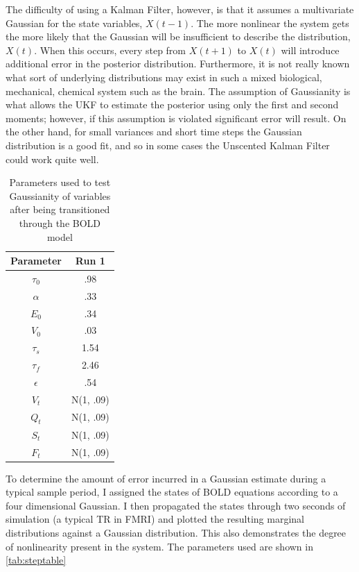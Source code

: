 The difficulty
of using a Kalman Filter, however, is that it assumes a multivariate 
Gaussian for the state variables, $X(t-1)$. The more nonlinear the system
gets the more likely that the Gaussian will be insufficient to describe
the distribution, $X(t)$. When this occurs, every step from  $X(t+1)$ 
to $X(t)$ will introduce additional
error in the posterior distribution. Furthermore, it is not really known what 
sort of underlying distributions may exist in such a mixed biological,
mechanical, chemical system such as the brain.
 The assumption of Gaussianity is what allows
the UKF to estimate the posterior using only the first and second moments;
however, if this assumption is violated significant error will result.
 On the other hand, for
small variances and short time steps the Gaussian distribution is a good 
fit, and so in some cases the Unscented Kalman Filter could work quite
well. 
\begin{table}[t]
\centering
\begin{tabular}{|c || c |}
\hline 
Parameter & Run 1 \\
\hline
$\tau_0$ & .98  \\
$\alpha$ & .33 \\
$E_0$ & .34  \\
$V_0$ & .03  \\
$\tau_s$ & 1.54  \\
$\tau_f$ & 2.46  \\
$\epsilon$ & .54  \\
$V_t$ & N(1, .09)  \\
$Q_t$ & N(1, .09)  \\
$S_t$ & N(1, .09) \\
$F_t$ & N(1, .09) \\
\hline
\end{tabular}
\caption{Parameters used to test Gaussianity of variables after being transitioned through
the BOLD model}
\label{tab:steptable} 
\end{table}

To determine the amount of error incurred in a Gaussian estimate during
a typical sample period, I assigned the states of BOLD equations according
to a four dimensional Gaussian. I then propagated the states through 
two seconds of simulation (a typical TR in FMRI) and plotted the resulting
marginal distributions against a Gaussian distribution. This also demonstrates
the degree of nonlinearity present in the system. The parameters used are 
shown in \autoref{tab:steptable}

